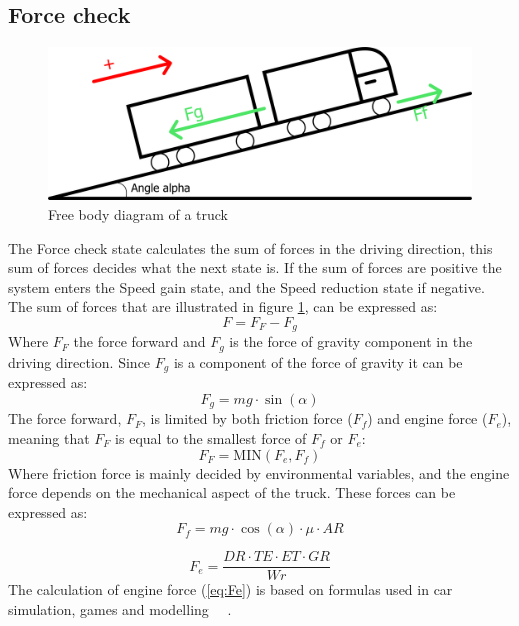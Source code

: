 \documentclass[noprint]{uit-thesis}
\begin{document}
\subsection{Force check}
\label{forceCheck}
\begin{figure} [H]
\centering
\includegraphics[width=\textwidth]{./photo/freeBodyDiagram.PNG}
\caption{Free body diagram of a truck}
\label{fig:FreeBodyDiagram}
\end{figure}
The Force check state calculates the sum of forces in the driving direction, this sum of forces decides what the next state is. If the sum of forces are positive the system enters the Speed gain state, and the Speed reduction state if negative. The sum of forces that are illustrated in figure \ref{fig:FreeBodyDiagram}, can be expressed as: 
\begin{equation}
\label{eq:SumForces}
F = F_F - F_g
\end{equation}
Where $F_F$ the force forward and $F_g$ is the force of gravity component in the driving direction. Since $F_g$ is a component of the force of gravity it can be expressed as: 
\begin{equation}
\label{eq:Fg}
F_g = mg \cdot \sin(\alpha)
\end{equation}
The force forward, $F_F$, is limited by both friction force ($F_f$) and engine force ($F_e$), meaning that $F_F$ is equal to the smallest force of $F_f$ or $F_e$:
\begin{equation}
\label{eq:FF}
F_F = \text{MIN}(F_e, F_f)
\end{equation}
Where friction force is mainly decided by environmental variables, and the engine force depends on the mechanical aspect of the truck. These forces can be expressed as: 
\begin{equation}
\label{eq:FricF}
F_f =mg \cdot \cos(\alpha) \cdot \mu \cdot AR
\end{equation}

\begin{equation}
\label{eq:Fe}
F_e = \frac{DR \cdot TE \cdot ET \cdot GR}{Wr}
\end{equation}
The calculation of engine force (\ref{eq:Fe}) is based on formulas used in car simulation, games and modelling ~\citep{carSIM}~\citep{carMODEL}.
\end{document}

